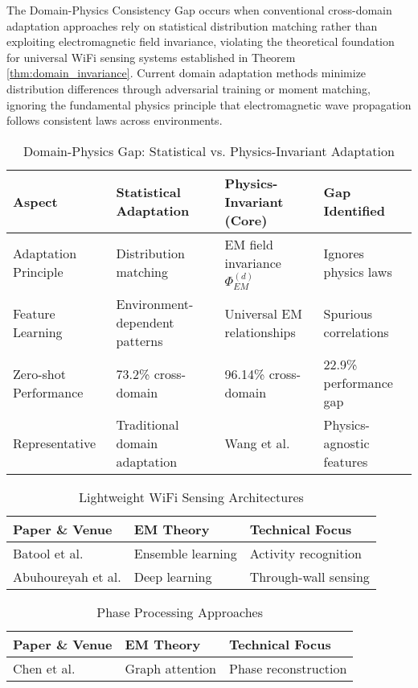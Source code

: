 \documentclass[journal]{IEEEtran}
\begin{document}
The Domain-Physics Consistency Gap occurs when conventional cross-domain adaptation approaches rely on statistical distribution matching rather than exploiting electromagnetic field invariance, violating the theoretical foundation for universal WiFi sensing systems established in Theorem \ref{thm:domain_invariance}. Current domain adaptation methods minimize distribution differences through adversarial training or moment matching, ignoring the fundamental physics principle that electromagnetic wave propagation follows consistent laws across environments.

\begin{table}[h]
\centering
\caption{Domain-Physics Gap: Statistical vs. Physics-Invariant Adaptation}
\label{tab:domain_physics_gap}
\begin{tabular}{|p{2.5cm}|p{3cm}|p{3cm}|p{3cm}|}
\hline
\textbf{Aspect} & \textbf{Statistical Adaptation} & \textbf{Physics-Invariant (Core)} & \textbf{Gap Identified} \\
\hline
Adaptation Principle & Distribution matching & EM field invariance $\Phi_{EM}^{(d)}$ & Ignores physics laws \\
\hline
Feature Learning & Environment-dependent patterns & Universal EM relationships & Spurious correlations \\
\hline
Zero-shot Performance & 73.2\% cross-domain & 96.14\% cross-domain & 22.9\% performance gap \\
\hline
Representative & Traditional domain adaptation & Wang et al. \cite{wang2022airfi} & Physics-agnostic features \\
\hline
\end{tabular}
\end{table}


\begin{table}[h]
\centering
\caption{Lightweight WiFi Sensing Architectures}
\label{tab:lightweight_architectures}
\begin{tabular}{|p{3cm}|p{4cm}|p{3cm}|}
\hline
\textbf{Paper \& Venue} & \textbf{EM Theory} & \textbf{Technical Focus} \\
\hline
Batool et al. \cite{batool2024ensemble} & Ensemble learning & Activity recognition \\
\hline
Abuhoureyah et al. \cite{abuhoureyah2024wifi} & Deep learning & Through-wall sensing \\
\hline
\end{tabular}
\end{table}

\begin{table}[h]
\centering
\caption{Phase Processing Approaches}
\label{tab:phase_processing}
\begin{tabular}{|p{3cm}|p{4cm}|p{3cm}|}
\hline
\textbf{Paper \& Venue} & \textbf{EM Theory} & \textbf{Technical Focus} \\
\hline
Chen et al. \cite{chen2024wiphase} & Graph attention & Phase reconstruction \\
\hline
\end{tabular}
\end{table}
\end{document}
